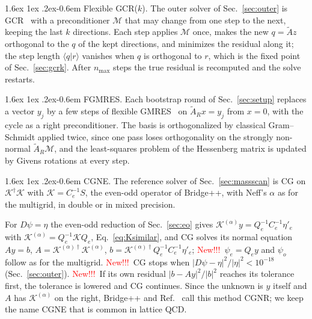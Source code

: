 \documentclass[11pt,a4paper]{article}
\makeatletter
\newif\ifshownew \shownewtrue
\DeclareRobustCommand\New{\ifshownew\textcolor{red}{New!!!}\ \else\ignorespaces\fi}
\renewcommand\paragraph{\@startsection{paragraph}{4}{\z@}%
  {1.6ex \@plus 1ex \@minus .2ex}{-0.6em}%
  {\normalfont\normalsize\itshape}}
\numberwithin{equation}{section}
\newcommand{\dg}{^{\dagger}}
\newcommand{\AR}{\tilde A_{R}}
\newcommand{\Ce}{C_{e}}
\makeatother
\begin{document}
\paragraph{Flexible GCR($k$).} The outer solver of Sec.~\ref{sec:outer} is GCR~\cite{ESS} with a
preconditioner $\mathcal M$ that may change from one step to the next, keeping the last $k$
directions. Each step applies $\mathcal M$ once, makes the new $q=\tilde Az$ orthogonal to the $q$
of the kept directions, and minimizes the residual along it; the step length $\langle q|r\rangle$
vanishes when $q$ is orthogonal to $r$, which is the fixed point of Sec.~\ref{sec:gcrk}. After
$n_{\max}$ steps the true residual is recomputed and the solve restarts.

\paragraph{FGMRES.} Each bootstrap round of Sec.~\ref{sec:setup} replaces a vector $y_j$ by a few
steps of flexible GMRES~\cite{SaadFGMRES} on $\AR x=y_j$ from $x=0$, with the cycle as a right
preconditioner. The basis is orthogonalized by classical Gram--Schmidt applied twice, since one
pass loses orthogonality on the strongly non-normal $\AR\mathcal M$, and the least-squares problem
of the Hessenberg matrix is updated by Givens rotations at every step.

\paragraph{CGNE.} The reference solver of Sec.~\ref{sec:massscan} is CG on $\mathcal K\dg\mathcal K$ with
$\mathcal K=\Ce^{-1}S$, the even-odd operator of Bridge++, with Neff's $\alpha$ as for the
multigrid, in double or in mixed precision.

For $D\psi=\eta$ the even-odd reduction of Sec.~\ref{sec:eo} gives $\mathcal K^{(\alpha)}y=Q_e^{-1}\Ce^{-1}\eta'_e$
with $\mathcal K^{(\alpha)}=Q_e^{-1}\mathcal KQ_e$, Eq.~\eqref{eq:Ksimilar}, and CG solves its normal
equation $A y=b$, $A=\mathcal K^{(\alpha)\dagger}\mathcal K^{(\alpha)}$,
$b=\mathcal K^{(\alpha)\dagger}Q_e^{-1}\Ce^{-1}\eta'_e$; \New $\psi_e=Q_ey$ and $\psi_o$ follow as for the
multigrid. \New CG stops when $|D\psi-\eta|^2/|\eta|^2<10^{-18}$ (Sec.~\ref{sec:outer}). \New If its own residual
$|b-Ay|^2/|b|^2$ reaches its tolerance first, the tolerance is lowered and CG continues. Since the unknown
is $y$ itself and $A$ has $\mathcal K^{(\alpha)}$ on the right, Bridge++ and Ref.~\cite{Saad} call this method CGNR; we
keep the name CGNE that is common in lattice QCD.
\end{document}
